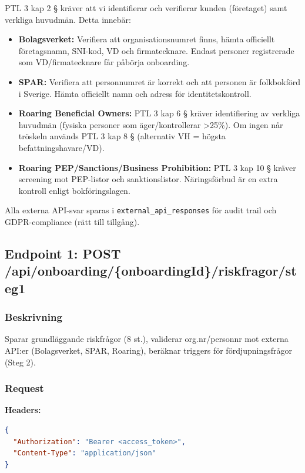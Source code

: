 PTL 3 kap 2 § kräver att vi identifierar och verifierar kunden (företaget) samt verkliga huvudmän. Detta innebär:

\begin{itemize}[noitemsep]
  \item \textbf{Bolagsverket:} Verifiera att organisationsnumret finns, hämta officiellt företagsnamn, SNI-kod, VD och firmatecknare. Endast personer registrerade som VD/firmatecknare får påbörja onboarding.
  \item \textbf{SPAR:} Verifiera att personnumret är korrekt och att personen är folkbokförd i Sverige. Hämta officiellt namn och adress för identitetskontroll.
  \item \textbf{Roaring Beneficial Owners:} PTL 3 kap 6 § kräver identifiering av verkliga huvudmän (fysiska personer som äger/kontrollerar >25\%). Om ingen når tröskeln används PTL 3 kap 8 § (alternativ VH = högsta befattningshavare/VD).
  \item \textbf{Roaring PEP/Sanctions/Business Prohibition:} PTL 3 kap 10 § kräver screening mot PEP-listor och sanktionslistor. Näringsförbud är en extra kontroll enligt bokföringslagen.
\end{itemize}

Alla externa API-svar sparas i \texttt{external\_api\_responses} för audit trail och GDPR-compliance (rätt till tillgång).

\subsection{Endpoint 1: POST /api/onboarding/\{onboardingId\}/riskfragor/steg1}

\subsubsection{Beskrivning}

Sparar grundläggande riskfrågor (8 st.), validerar org.nr/personnr mot externa API:er (Bolagsverket, SPAR, Roaring), beräknar triggers för fördjupningsfrågor (Steg 2).

\subsubsection{Request}

\textbf{Headers:}
\begin{lstlisting}[language=json]
{
  "Authorization": "Bearer <access_token>",
  "Content-Type": "application/json"
}
\end{lstlisting}

